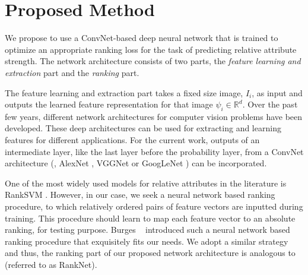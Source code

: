 

\section{Proposed Method}
\label{sec.3}

We propose to use a ConvNet-based deep neural network that is trained to optimize an appropriate ranking loss for the task of predicting relative attribute strength. The network architecture consists of two parts, the \textit{feature learning and extraction} part and the \textit{ranking} part.

The feature learning and extraction part takes a fixed size image, $I_i$, as input and outputs the learned feature representation for that image $\psi_i \in \mathbb{R}^d$.
Over the past few years, different network architectures for computer vision problems have been developed. These deep architectures can be used for extracting and learning features for different applications.
For the current work, outputs of an intermediate layer, like the last layer before the probability layer, from a ConvNet architecture (\eg, AlexNet \cite{krizshevsky}, VGGNet \cite{verydeep} or GoogLeNet \cite{googlenet}) can be incorporated. %

One of the most widely used models for relative attributes in the literature is RankSVM \cite{Joachims2002}. However,
in our case, we seek a neural network based ranking procedure, to which relatively ordered pairs of feature vectors are inputted during training. This procedure should learn to map each feature vector to an absolute ranking, for testing purpose. Burges \etal~\cite{Burges2005} introduced such a neural network based ranking procedure that exquisitely fits our needs. %
We adopt a similar strategy and thus, the ranking part of our proposed network architecture is analogous to \cite{Burges2005} (referred to as RankNet).


